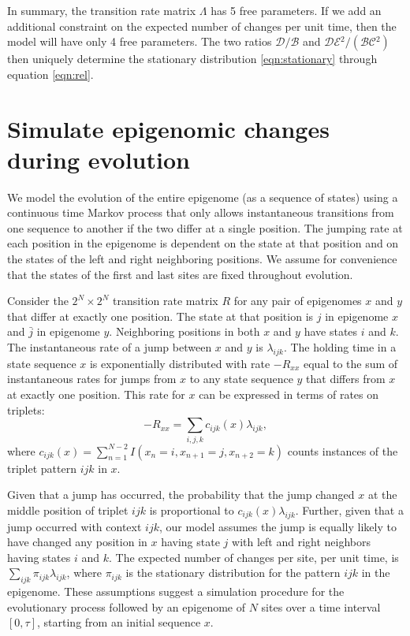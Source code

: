 \documentclass[11pt]{article}
\newcommand{\birth}{\ensuremath{\mathcal{B}}}
\newcommand{\death}{\ensuremath{\mathcal{D}}}
\newcommand{\expansion}{\ensuremath{\mathcal{E}}}
\newcommand{\contraction}{\ensuremath{\mathcal{C}}}
\begin{document}
In summary, the transition rate matrix $\Lambda$ has 5 free
parameters. If we add an additional constraint on the expected number
of changes per unit time, then the model will have only 4 free
parameters. The two ratios $\death{}/\birth{}$ and
$\death{}\expansion{}^2/(\birth{}\contraction{}^2)$ then uniquely
determine the stationary distribution \eqref{eqn:stationary} through
equation \eqref{eqn:rel}.

\section{Simulate epigenomic changes during evolution}


We model the evolution of the entire epigenome (as a sequence of
states) using a continuous time Markov process that only allows
instantaneous transitions from one sequence to another if the two
differ at a single position. The jumping rate at each position in the
epigenome is dependent on the state at that position and on the states
of the left and right neighboring positions. We assume for convenience
that the states of the first and last sites are fixed throughout
evolution.

Consider the $2^N \times 2^N$ transition rate matrix $R$ for any pair
of epigenomes $x$ and $y$ that differ at exactly one position. The
state at that position is $j$ in epigenome $x$ and $\bar{j}$ in
epigenome $y$. Neighboring positions in both $x$ and $y$ have states
$i$ and $k$. The instantaneous rate of a jump between $x$ and $y$
is $\lambda_{ijk}$.
The holding time in a state sequence $x$ is exponentially distributed
with rate $-R_{xx}$ equal to the sum of instantaneous rates for jumps
from $x$ to any state sequence $y$ that differs from $x$ at exactly
one position. This rate for $x$ can be expressed in terms of rates on
triplets:
\[
-R_{xx} = \sum_{i,j,k}c_{ijk}(x)\lambda_{ijk},
\]
where $c_{ijk}(x) = \sum_{n=1}^{N-2}I(x_{n}=i, x_{n+1}=j, x_{n+2}=k)$
counts instances of the triplet pattern $ijk$ in $x$.

Given that a jump has occurred, the probability that the jump changed
$x$ at the middle position of triplet $ijk$ is proportional to
$c_{ijk}(x)\lambda_{ijk}$. Further, given that a jump occurred with
context $ijk$, our model assumes the jump is equally likely to have
changed any position in $x$ having state $j$ with left and right
neighbors having states $i$ and $k$.
The expected number of changes per site, per unit time, is
$\sum_{ijk}\pi_{ijk}\lambda_{ijk}$, where $\pi_{ijk}$ is the
stationary distribution for the pattern $ijk$ in the epigenome.
These assumptions suggest a simulation procedure for the evolutionary
process followed by an epigenome of $N$ sites over a time interval
$[0, \tau]$, starting from an initial sequence $x$.
\end{document}
